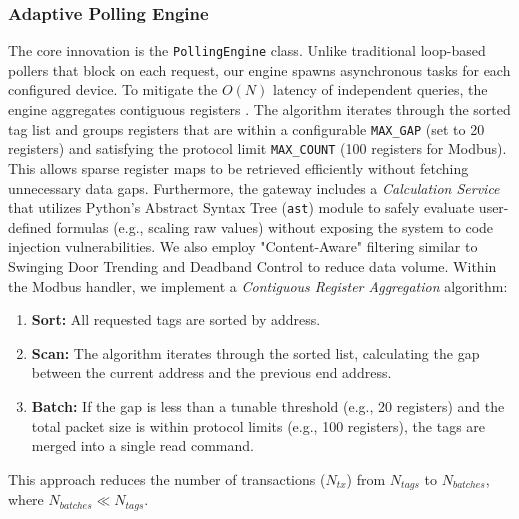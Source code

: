 \documentclass[journal]{IEEEtran}
\begin{document}
\subsubsection{Adaptive Polling Engine}
The core innovation is the \texttt{PollingEngine} class. Unlike traditional loop-based pollers that block on each request, our engine spawns asynchronous tasks for each configured device.
To mitigate the $O(N)$ latency of independent queries, the engine aggregates contiguous registers \cite{modbus_performance}.
The algorithm iterates through the sorted tag list and groups registers that are within a configurable \texttt{MAX\_GAP} (set to 20 registers) and satisfying the protocol limit \texttt{MAX\_COUNT} (100 registers for Modbus). This allows sparse register maps to be retrieved efficiently without fetching unnecessary data gaps.
Furthermore, the gateway includes a \textit{Calculation Service} that utilizes Python's Abstract Syntax Tree (\texttt{ast}) module to safely evaluate user-defined formulas (e.g., scaling raw values) without exposing the system to code injection vulnerabilities.
We also employ "Content-Aware" filtering similar to Swinging Door Trending \cite{sdt_compression} and Deadband Control \cite{deadband_control} to reduce data volume. 
Within the Modbus handler, we implement a \textit{Contiguous Register Aggregation} algorithm:
\begin{enumerate}
    \item \textbf{Sort:} All requested tags are sorted by address.
    \item \textbf{Scan:} The algorithm iterates through the sorted list, calculating the gap between the current address and the previous end address.
    \item \textbf{Batch:} If the gap is less than a tunable threshold (e.g., 20 registers) and the total packet size is within protocol limits (e.g., 100 registers), the tags are merged into a single read command.
\end{enumerate}

This approach reduces the number of transactions ($N_{tx}$) from $N_{tags}$ to $N_{batches}$, where $N_{batches} \ll N_{tags}$.
\end{document}
